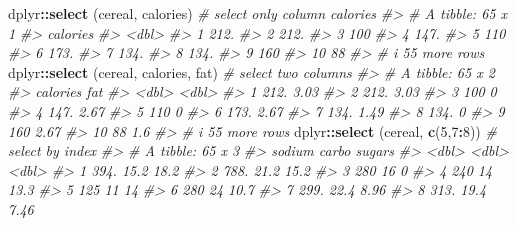 \documentclass[
]{book}
\newenvironment{Shaded}{\begin{snugshade}}{\end{snugshade}}
\newcommand{\CommentTok}[1]{\textcolor[rgb]{0.56,0.35,0.01}{\textit{#1}}}
\newcommand{\DecValTok}[1]{\textcolor[rgb]{0.00,0.00,0.81}{#1}}
\newcommand{\FunctionTok}[1]{\textcolor[rgb]{0.13,0.29,0.53}{\textbf{#1}}}
\newcommand{\NormalTok}[1]{#1}
\newcommand{\SpecialCharTok}[1]{\textcolor[rgb]{0.81,0.36,0.00}{\textbf{#1}}}
\begin{document}
\begin{Shaded}
\begin{Highlighting}[]
\NormalTok{dplyr}\SpecialCharTok{::}\FunctionTok{select}\NormalTok{ (cereal, calories)        }\CommentTok{\# select only column calories}
\CommentTok{\#\textgreater{} \# A tibble: 65 x 1}
\CommentTok{\#\textgreater{}    calories}
\CommentTok{\#\textgreater{}       \textless{}dbl\textgreater{}}
\CommentTok{\#\textgreater{}  1     212.}
\CommentTok{\#\textgreater{}  2     212.}
\CommentTok{\#\textgreater{}  3     100 }
\CommentTok{\#\textgreater{}  4     147.}
\CommentTok{\#\textgreater{}  5     110 }
\CommentTok{\#\textgreater{}  6     173.}
\CommentTok{\#\textgreater{}  7     134.}
\CommentTok{\#\textgreater{}  8     134.}
\CommentTok{\#\textgreater{}  9     160 }
\CommentTok{\#\textgreater{} 10      88 }
\CommentTok{\#\textgreater{} \# i 55 more rows}
\NormalTok{dplyr}\SpecialCharTok{::}\FunctionTok{select}\NormalTok{ (cereal, calories, fat)   }\CommentTok{\# select two columns}
\CommentTok{\#\textgreater{} \# A tibble: 65 x 2}
\CommentTok{\#\textgreater{}    calories   fat}
\CommentTok{\#\textgreater{}       \textless{}dbl\textgreater{} \textless{}dbl\textgreater{}}
\CommentTok{\#\textgreater{}  1     212.  3.03}
\CommentTok{\#\textgreater{}  2     212.  3.03}
\CommentTok{\#\textgreater{}  3     100   0   }
\CommentTok{\#\textgreater{}  4     147.  2.67}
\CommentTok{\#\textgreater{}  5     110   0   }
\CommentTok{\#\textgreater{}  6     173.  2.67}
\CommentTok{\#\textgreater{}  7     134.  1.49}
\CommentTok{\#\textgreater{}  8     134.  0   }
\CommentTok{\#\textgreater{}  9     160   2.67}
\CommentTok{\#\textgreater{} 10      88   1.6 }
\CommentTok{\#\textgreater{} \# i 55 more rows}
\NormalTok{dplyr}\SpecialCharTok{::}\FunctionTok{select}\NormalTok{ (cereal, }\FunctionTok{c}\NormalTok{(}\DecValTok{5}\NormalTok{,}\DecValTok{7}\SpecialCharTok{:}\DecValTok{8}\NormalTok{))        }\CommentTok{\# select by index}
\CommentTok{\#\textgreater{} \# A tibble: 65 x 3}
\CommentTok{\#\textgreater{}    sodium carbo sugars}
\CommentTok{\#\textgreater{}     \textless{}dbl\textgreater{} \textless{}dbl\textgreater{}  \textless{}dbl\textgreater{}}
\CommentTok{\#\textgreater{}  1   394.  15.2  18.2 }
\CommentTok{\#\textgreater{}  2   788.  21.2  15.2 }
\CommentTok{\#\textgreater{}  3   280   16     0   }
\CommentTok{\#\textgreater{}  4   240   14    13.3 }
\CommentTok{\#\textgreater{}  5   125   11    14   }
\CommentTok{\#\textgreater{}  6   280   24    10.7 }
\CommentTok{\#\textgreater{}  7   299.  22.4   8.96}
\CommentTok{\#\textgreater{}  8   313.  19.4   7.46}

\end{Highlighting}
\end{Shaded}
\end{document}
